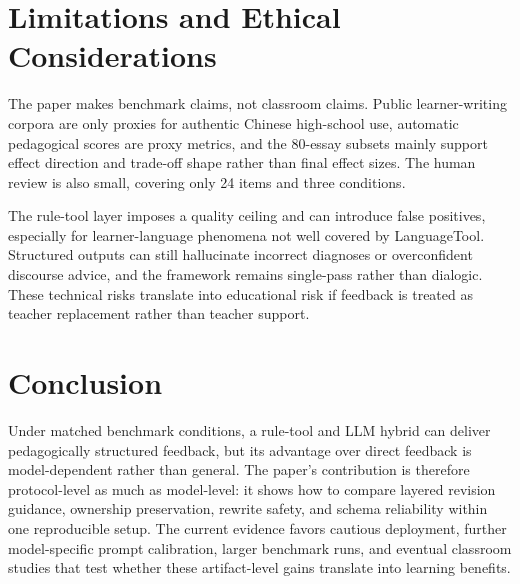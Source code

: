 \documentclass[preprint,12pt]{elsarticle}
\begin{document}
\section{Limitations and Ethical Considerations}

The paper makes benchmark claims, not classroom claims. Public learner-writing corpora are only proxies for authentic Chinese high-school use, automatic pedagogical scores are proxy metrics, and the 80-essay subsets mainly support effect direction and trade-off shape rather than final effect sizes. The human review is also small, covering only 24 items and three conditions.

The rule-tool layer imposes a quality ceiling and can introduce false positives, especially for learner-language phenomena not well covered by LanguageTool. Structured outputs can still hallucinate incorrect diagnoses or overconfident discourse advice, and the framework remains single-pass rather than dialogic. These technical risks translate into educational risk if feedback is treated as teacher replacement rather than teacher support.

\section{Conclusion}

Under matched benchmark conditions, a rule-tool and LLM hybrid can deliver pedagogically structured feedback, but its advantage over direct feedback is model-dependent rather than general. The paper's contribution is therefore protocol-level as much as model-level: it shows how to compare layered revision guidance, ownership preservation, rewrite safety, and schema reliability within one reproducible setup. The current evidence favors cautious deployment, further model-specific prompt calibration, larger benchmark runs, and eventual classroom studies that test whether these artifact-level gains translate into learning benefits.



\end{document}
